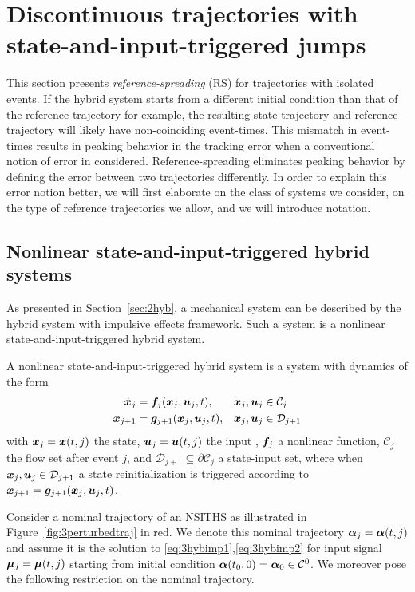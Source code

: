 \documentclass[../DC2017114Bouma.tex]{subfiles}
\begin{document}
\section{Discontinuous trajectories with state-and-input-triggered jumps}
This section presents \textit{reference-spreading} (RS) for trajectories with isolated events. If the hybrid system starts from a different initial condition than that of the reference trajectory for example, the resulting state trajectory and reference trajectory will likely have non-coinciding event-times. This mismatch in event-times results in peaking behavior in the tracking error when a conventional notion of error in considered. Reference-spreading eliminates peaking behavior by defining the error between two trajectories differently. In order to explain this error notion better, we will first elaborate on the class of systems we consider, on the type of reference trajectories we allow, and we will introduce notation.
%

\subsection{Nonlinear state-and-input-triggered hybrid systems}
As presented in Section~\ref{sec:2hyb}, a mechanical system can be described by the hybrid system with impulsive effects framework. Such a system is a nonlinear state-and-input-triggered hybrid system.

\begin{mydef}[NSITHS]\label{def:3nsiths}
A nonlinear state-and-input-triggered hybrid system is a system with dynamics of the form
\begin{align}
\dot{{\boldsymbol{x}}}_j &={\boldsymbol{f}}_j({\boldsymbol{x}}_j,{\boldsymbol{u}}_j,t), &{\boldsymbol{x}}_j,{\boldsymbol{u}}_j&\in \mathcal{C}_j\label{eq:3hybimp1}\\
{\boldsymbol{x}}_{j+1} &= {\boldsymbol{g}}_{j+1}({\boldsymbol{x}}_j,{\boldsymbol{u}}_j,t), &{\boldsymbol{x}}_j,{\boldsymbol{u}}_j&\in \mathcal{D}_{j+1} \label{eq:3hybimp2}
\end{align}
with ${\boldsymbol{x}}_j = {\boldsymbol{x}}(t,j)$ the state, ${\boldsymbol{u}}_j = {\boldsymbol{u}}(t,j)$ the input , ${\boldsymbol{f}}_j$ a nonlinear function, $\mathcal{C}_j$ the flow set after event $j$, and $\mathcal{D}_{j+1}\subseteq\partial \mathcal{C}_j$ a state-input set, where when ${\boldsymbol{x}}_j,{\boldsymbol{u}}_j\in \mathcal{D}_{j+1}$ a state reinitialization is triggered according to ${\boldsymbol{x}}_{j+1} = {\boldsymbol{g}}_{j+1}({\boldsymbol{x}}_j,{\boldsymbol{u}}_j,t)$.
\end{mydef} 

Consider a nominal trajectory of an NSITHS as illustrated in Figure~\ref{fig:3perturbedtraj} in red. We denote this nominal trajectory $\boldsymbol{\alpha}_j=\boldsymbol{\alpha}(t,j)$ and assume it is the solution to \eqref{eq:3hybimp1},\eqref{eq:3hybimp2} for input signal $\boldsymbol{\mu}_j=\boldsymbol{\mu}(t,j)$ starting from initial condition $\boldsymbol{\alpha}(t_0,0)=\boldsymbol{\alpha}_0\in \mathcal{C}^0$. We moreover pose the following restriction on the nominal trajectory.
\end{document}
